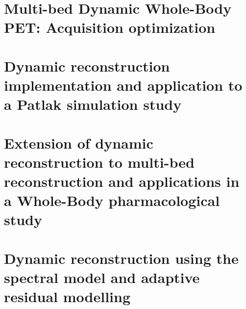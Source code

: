 
\chapter{Multi-bed Dynamic Whole-Body PET: Acquisition optimization}
\label{Chap3_1:AcquisitionOptimization}


\chapter{Dynamic reconstruction implementation and application to a Patlak simulation study}
\label{Chap3_2:SimStudy}


\chapter[Extension of dynamic reconstruction to multi-bed reconstruction]{Extension of dynamic reconstruction to multi-bed reconstruction and applications in a Whole-Body pharmacological study}
\label{Chap3_3:IsotoPK}


\chapter{Dynamic reconstruction using the spectral model and adaptive residual modelling}
\label{Chap3_4:Residual}
